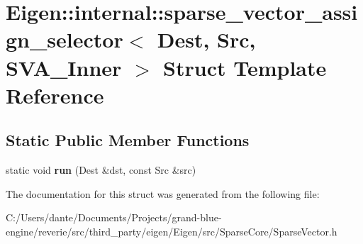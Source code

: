 \hypertarget{struct_eigen_1_1internal_1_1sparse__vector__assign__selector_3_01_dest_00_01_src_00_01_s_v_a___inner_01_4}{}\section{Eigen\+::internal\+::sparse\+\_\+vector\+\_\+assign\+\_\+selector$<$ Dest, Src, S\+V\+A\+\_\+\+Inner $>$ Struct Template Reference}
\label{struct_eigen_1_1internal_1_1sparse__vector__assign__selector_3_01_dest_00_01_src_00_01_s_v_a___inner_01_4}
\subsection*{Static Public Member Functions}
\begin{DoxyCompactItemize}
\item 
\mbox{\label{struct_eigen_1_1internal_1_1sparse__vector__assign__selector_3_01_dest_00_01_src_00_01_s_v_a___inner_01_4_affecf3f90481f6ce52db7192052a0320}} 
static void {\bfseries run} (Dest \&dst, const Src \&src)
\end{DoxyCompactItemize}


The documentation for this struct was generated from the following file\+:\begin{DoxyCompactItemize}
\item 
C\+:/\+Users/dante/\+Documents/\+Projects/grand-\/blue-\/engine/reverie/src/third\+\_\+party/eigen/\+Eigen/src/\+Sparse\+Core/Sparse\+Vector.\+h\end{DoxyCompactItemize}
